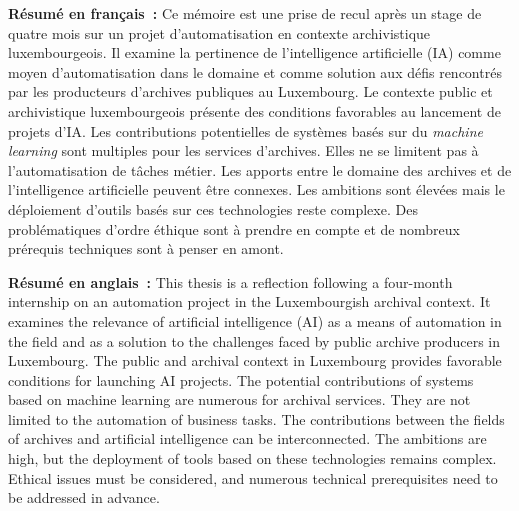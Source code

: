 \textbf{Résumé en français~:} 
Ce mémoire est une prise de recul après un stage de quatre mois sur un projet d'automatisation en contexte archivistique luxembourgeois.
Il examine la pertinence de l'intelligence artificielle (IA) comme moyen d'automatisation dans 
le domaine et comme solution aux défis rencontrés par les producteurs d'archives publiques au Luxembourg. Le contexte public et archivistique luxembourgeois présente des conditions favorables 
au lancement de projets d'IA.  
Les contributions potentielles de systèmes basés sur du \emph{machine learning} sont multiples 
pour les services d'archives. Elles ne se limitent pas à l'automatisation de tâches métier. 
Les apports entre le domaine des archives et de l'intelligence artificielle peuvent être connexes. 
Les ambitions sont élevées mais le déploiement d'outils basés sur ces technologies reste complexe. Des problématiques d'ordre éthique sont à prendre en compte et de nombreux prérequis techniques sont à penser en amont.

\textbf{Résumé en anglais~:} This thesis is a reflection following a four-month internship on an automation project in the Luxembourgish archival context. It examines the relevance of artificial intelligence (AI) as a means of automation in the field and as a solution to the challenges faced by public archive producers in Luxembourg. The public and archival context in Luxembourg provides favorable conditions for launching AI projects. The potential contributions of systems based on machine learning are numerous for archival services. They are not limited to the automation of business tasks. The contributions between the fields of archives and artificial intelligence can be interconnected. The ambitions are high, but the deployment of tools based on these technologies remains complex. Ethical issues must be considered, and numerous technical prerequisites need to be addressed in advance.\vspace{0.3cm}


